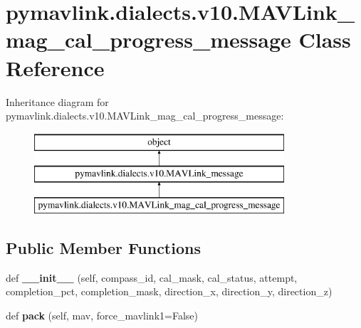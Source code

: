 \hypertarget{classpymavlink_1_1dialects_1_1v10_1_1MAVLink__mag__cal__progress__message}{}\section{pymavlink.\+dialects.\+v10.\+M\+A\+V\+Link\+\_\+mag\+\_\+cal\+\_\+progress\+\_\+message Class Reference}
\label{classpymavlink_1_1dialects_1_1v10_1_1MAVLink__mag__cal__progress__message}
Inheritance diagram for pymavlink.\+dialects.\+v10.\+M\+A\+V\+Link\+\_\+mag\+\_\+cal\+\_\+progress\+\_\+message\+:\begin{figure}[H]
\begin{center}
\leavevmode
\includegraphics[height=3.000000cm]{classpymavlink_1_1dialects_1_1v10_1_1MAVLink__mag__cal__progress__message}
\end{center}
\end{figure}
\subsection*{Public Member Functions}
\begin{DoxyCompactItemize}
\item 
\mbox{\label{classpymavlink_1_1dialects_1_1v10_1_1MAVLink__mag__cal__progress__message_a746ec63cb01198e3317ea2bf6c99cf21}} 
def {\bfseries \+\_\+\+\_\+init\+\_\+\+\_\+} (self, compass\+\_\+id, cal\+\_\+mask, cal\+\_\+status, attempt, completion\+\_\+pct, completion\+\_\+mask, direction\+\_\+x, direction\+\_\+y, direction\+\_\+z)
\item 
\mbox{\label{classpymavlink_1_1dialects_1_1v10_1_1MAVLink__mag__cal__progress__message_a002e3ea23305e1758f64a0b06ab09c68}} 
def {\bfseries pack} (self, mav, force\+\_\+mavlink1=False)
\end{DoxyCompactItemize}
